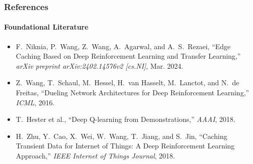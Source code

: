 \documentclass[aspectratio=169, 10pt]{beamer}
\begin{document}
\begin{frame}
\begin{columns}[T, onlytextwidth]
        \vspace{0.2cm}
    \end{columns}
\end{frame}

\begin{frame}
    \frametitle{References}
    \framesubtitle{Foundational Literature}

    \vspace{0.6cm}
    \begin{itemize}
        \setlength{\itemsep}{0.5cm}
        \item[{[1]}] F.~Niknia, P.~Wang, Z.~Wang, A.~Agarwal, and A.~S.~Rezaei, ``Edge Caching Based on Deep Reinforcement Learning and Transfer Learning,'' \textit{arXiv preprint arXiv:2402.14576v2 [cs.NI]}, Mar. 2024.
        \item[{[2]}] Z.~Wang, T.~Schaul, M.~Hessel, H.~van Hasselt, M.~Lanctot, and N.~de Freitas, ``Dueling Network Architectures for Deep Reinforcement Learning,'' \textit{ICML}, 2016.
        \item[{[3]}] T.~Hester et al., ``Deep Q-learning from Demonstrations,'' \textit{AAAI}, 2018.
        \item[{[4]}] H.~Zhu, Y.~Cao, X.~Wei, W.~Wang, T.~Jiang, and S.~Jin, ``Caching Transient Data for Internet of Things: A Deep Reinforcement Learning Approach,'' \textit{IEEE Internet of Things Journal}, 2018.
    \end{itemize}
\end{frame}
\end{document}
